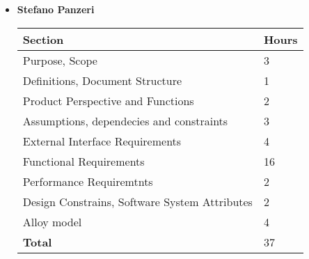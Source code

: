\begin{itemize}
\item \textbf{Stefano Panzeri}

\begin{table}[!h]
\centering
\begin{tabular}{|l|l|}
\hline
 \textbf{Section}														&		\textbf{Hours}  \\ \hline
Purpose, Scope														& 		3 	\\ \hline
Definitions, Document Structure							& 		1 	\\ \hline
Product Perspective and Functions						& 		2 	\\ \hline
Assumptions, dependecies and constraints			&  	3	\\ \hline
External Interface Requirements							& 		4 	\\ \hline
Functional Requirements										& 		16 	\\ \hline
Performance Requiremtnts									&  	2	\\ \hline
Design Constrains, Software System Attributes	&  	2	\\ \hline
Alloy model   															&   	4    \\ \hline
\textbf{Total}															& 		37 	\\ \hline
\end{tabular}
\end{table}


\end{itemize}
